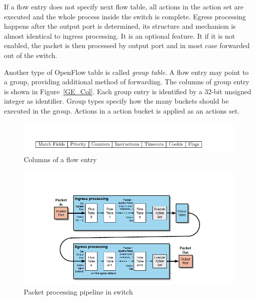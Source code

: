 If a flow entry does not specify next flow table, all actions in the action set are executed and the whole process inside the switch is complete. Egress processing happens after the output port is determined, its structure and mechanism is almost identical to ingress processing. It is an optional feature. It if it is not enabled, the packet is then processed by output port and in most case forwarded out of the switch. \cite{OF_SPEC}

Another type of OpenFlow table is called \textit{group table}. A flow entry may point to a group, providing additional method of forwarding. The columns of group entry is shown in Figure~\ref{GE_Col}. Each group entry is identified by a 32-bit unsigned integer as identifier. Group types specify how the many buckets should be executed in the group. Actions in a action bucket is applied as an actions set.

\begin{figure}[H]
\begin{center} 
\includegraphics[width=1\textwidth]{figures/columns_of_flow_entry.png}
\end{center}
\caption{Columns of a flow entry}
\label{FE_Col}
\end{figure}

\begin{figure}[H]
\begin{center} 
\includegraphics[width=1.2\textwidth]{figures/packet_flow_thru_processing_pipeline.png}
\end{center}
\caption{Packet processing pipeline in switch}
\label{PPPIS}
\end{figure}


